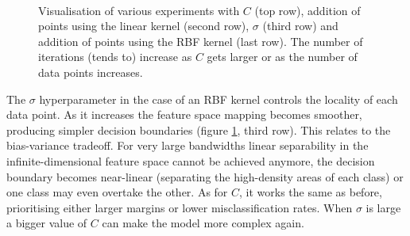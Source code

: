 \begin{figure}[h]
\qquad
{}\\
\qquad
{}\qquad
{}
\caption{Visualisation of various experiments with $C$ (top row), addition of points using the linear kernel (second row), $\sigma$ (third row) and addition of points using the RBF kernel (last row). The number of iterations (tends to) increase as $C$ gets larger or as the number of data points increases.}
\label{stanfordexample}
\end{figure}

The $\sigma$ hyperparameter in the case of an RBF kernel controls the locality of each data point. As it increases the feature space mapping becomes smoother, producing simpler decision boundaries (figure \ref{stanfordexample}, third row). This relates to the bias-variance tradeoff. For very large bandwidths linear separability in the infinite-dimensional feature space cannot be achieved anymore, the decision boundary becomes near-linear (separating the high-density areas of each class) or one class may even overtake the other. As for $C$, it works the same as before, prioritising either larger margins or lower misclassification rates. When $\sigma$ is large a bigger value of $C$ can make the model more complex again. 

